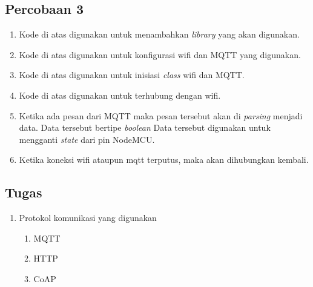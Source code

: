 \documentclass{class}
\begin{document}
  \subsection{Percobaan 3}
  \begin{enumerate}
      \item 
      Kode di atas digunakan untuk menambahkan \emph{library} yang akan digunakan. \\
      \item 
      Kode di atas digunakan untuk konfigurasi wifi dan MQTT yang digunakan. \\
      \item 
      Kode di atas digunakan untuk inisiasi \emph{class} wifi dan MQTT.
      \item 
      Kode di atas digunakan untuk terhubung dengan wifi. \\
      \item 
      Ketika ada pesan dari MQTT maka pesan tersebut akan di \emph{parsing} menjadi data.
      Data tersebut bertipe \emph{boolean}
      Data tersebut digunakan untuk mengganti \emph{state} dari pin NodeMCU. \\
      \item 
      Ketika koneksi wifi ataupun mqtt terputus, maka akan dihubungkan kembali.
  \end{enumerate}
  \subsection{Tugas}
  \begin{enumerate}
    \item Protokol komunikasi yang digunakan
    \begin{enumerate}
      \item MQTT
      \item HTTP
      \item CoAP
    \end{enumerate}
  \end{enumerate}
    
\end{document}
